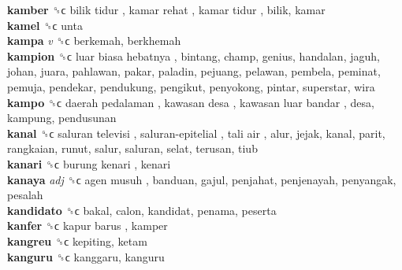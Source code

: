 \textbf{kamber} ␝ϲ   bilik tidur ,  kamar rehat ,  kamar tidur , bilik, kamar  \\
\textbf{kamel} ␝ϲ  unta  \\
\textbf{kampa} \emph{v}  ␝ϲ  berkemah, berkhemah  \\
\textbf{kampion} ␝ϲ   luar biasa hebatnya , bintang, champ, genius, handalan, jaguh, johan, juara, pahlawan, pakar, paladin, pejuang, pelawan, pembela, peminat, pemuja, pendekar, pendukung, pengikut, penyokong, pintar, superstar, wira  \\
\textbf{kampo} ␝ϲ   daerah pedalaman ,  kawasan desa ,  kawasan luar bandar , desa, kampung, pendusunan  \\
\textbf{kanal} ␝ϲ   saluran televisi ,  saluran-epitelial ,  tali air , alur, jejak, kanal, parit, rangkaian, runut, salur, saluran, selat, terusan, tiub  \\
\textbf{kanari} ␝ϲ   burung kenari , kenari  \\
\textbf{kanaya} \emph{adj}  ␝ϲ   agen musuh , banduan, gajul, penjahat, penjenayah, penyangak, pesalah  \\
\textbf{kandidato} ␝ϲ  bakal, calon, kandidat, penama, peserta  \\
\textbf{kanfer} ␝ϲ   kapur barus , kamper  \\
\textbf{kangreu} ␝ϲ  kepiting, ketam  \\
\textbf{kanguru} ␝ϲ  kanggaru, kanguru  \\
